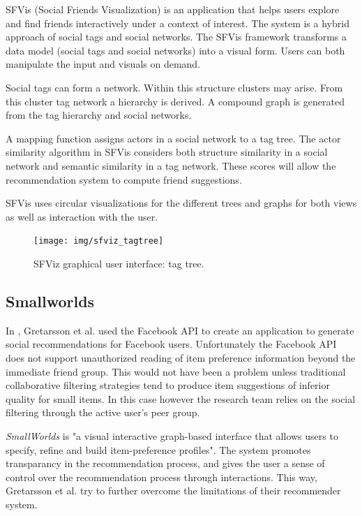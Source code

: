 SFVis (Social Friends Visualization) is an application that helps users explore and find friends interactively under a context of interest. The system is a hybrid approach of social tags and social networks. The SFVis framework transforms a data model (social tags and social networks) into a visual form. Users can both manipulate the input and visuals on demand.

Social tags can form a network. Within this structure clusters may arise. From this cluster tag network a hierarchy is derived. A compound graph is generated from the tag hierarchy and social networks.

A mapping function assigns actors in a social network to a tag tree. The actor similarity algorithm in SFVis considers both structure similarity in a social network and semantic similarity in a tag network. These scores will allow the recommendation system to compute friend suggestions.

SFVis uses circular visualizations for the different trees and graphs for both views as well as interaction with the user.

\begin{figure}%
	\begin{center}
		\texttt{[image: img/sfviz\_tagtree]}%
	\end{center}
	\caption{SFViz graphical user interface: tag tree.}%
	\label{figure:sfviz}%
\end{figure}




\subsection{Smallworlds}\label{chapter:survey:section:applications:subsection:smallwords}

In \cite{gretarsson:2010}, Gretarsson et al. used the Facebook API to create an application to generate social recommendations for Facebook users. Unfortunately the Facebook API does not support unauthorized reading of item preference information beyond the immediate friend group. This would not have been a problem unless traditional collaborative filtering strategies tend to produce item suggestions of inferior quality for small items. In this case however the research team relies on the social filtering through the active user's peer group\cite{gretarsson:2010}.

\emph{SmallWorlds} is "a visual interactive graph-based interface that allows users to specify, refine and build item-preference profiles"\cite{gretarsson:2010}. The system promotes transparancy in the recommendation process, and gives the user a sense of control over the recommendation process through interactions. This way, Gretarsson et al. try to further overcome the limitations of their recommender system\cite{gretarsson:2010}.

